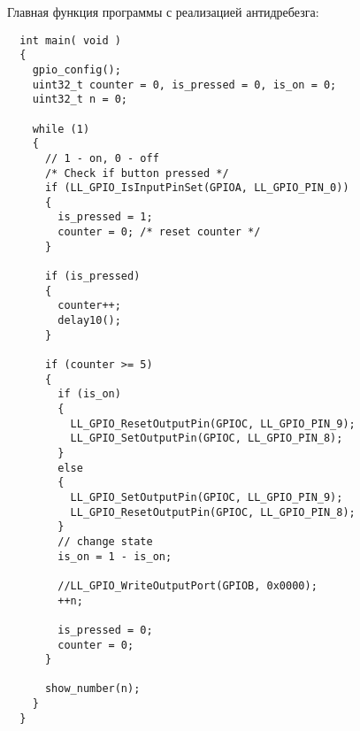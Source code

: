 Главная функция программы с реализацией антидребезга:
\begin{verbatim}
  int main( void )
  { 
    gpio_config();
    uint32_t counter = 0, is_pressed = 0, is_on = 0;
    uint32_t n = 0;
    
    while (1)
    {
      // 1 - on, 0 - off
      /* Check if button pressed */
      if (LL_GPIO_IsInputPinSet(GPIOA, LL_GPIO_PIN_0))
      {
        is_pressed = 1; 
        counter = 0; /* reset counter */
      }
     
      if (is_pressed)
      {
        counter++;
        delay10();
      }
      
      if (counter >= 5)
      {
        if (is_on)
        {
          LL_GPIO_ResetOutputPin(GPIOC, LL_GPIO_PIN_9);
          LL_GPIO_SetOutputPin(GPIOC, LL_GPIO_PIN_8);
        }
        else
        {
          LL_GPIO_SetOutputPin(GPIOC, LL_GPIO_PIN_9);
          LL_GPIO_ResetOutputPin(GPIOC, LL_GPIO_PIN_8);
        }
        // change state
        is_on = 1 - is_on;
      
        //LL_GPIO_WriteOutputPort(GPIOB, 0x0000);
        ++n;
        
        is_pressed = 0;
        counter = 0;
      }
      
      show_number(n);
    }
  }
  
  \end{verbatim}